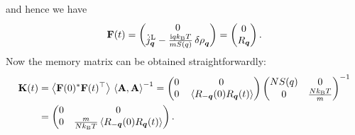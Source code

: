 \documentclass[hyperref, a4paper]{article}
\newcommand*{\ii}{\mathrm{i}}
\begin{document}
and hence we have 
\begin{equation}
    \vb{F}(t) = \pmqty{0 \\ \dot{j}_{\vb*{q}}^\text{L} - \frac{\ii q k_\text{B} T}{m S(q)} \var{\rho}_{\vb*{q}} }
    = \pmqty{0 \\ R_{\vb*{q}}}.
    \label{eq:f-q-eq}
\end{equation}
Now the memory matrix can be obtained straightforwardly:
\begin{equation}
    \begin{aligned}
        \vb{K}(t) &= \expval{\vb{F}(0)^* \vb{F}(t)^\top} \expval*{\vb{A}, \vb{A}}^{-1} = \pmqty{0 & 0 \\ 0 & \expval*{R_{-\vb*{q}}(0) R_{\vb*{q}}(t)}} \pmqty{
        N S(q) & 0 \\ 
        0 &  \frac{N k_\text{B} T}{m}
    }^{-1} \\
    &=  \pmqty{0 & 0 \\ 0 & \frac{m}{N k_\text{B} T} \expval*{R_{-\vb*{q}}(0) R_{\vb*{q}}(t)}}.
    \end{aligned}
    \label{eq:k-eq}
\end{equation}
\end{document}
